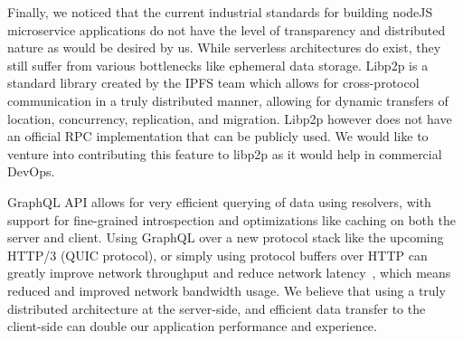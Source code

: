 Finally, we noticed that the current industrial standards for building nodeJS microservice applications do not have the level of transparency and distributed nature as would be desired by us. While serverless architectures do exist, they still suffer from various bottlenecks like ephemeral data storage. Libp2p is a standard library created by the IPFS team which allows for cross-protocol communication in a truly distributed manner, 
allowing for dynamic transfers of location, concurrency, replication, and migration. Libp2p however does not have an official RPC implementation that can be publicly used. We would like to venture into contributing this feature to libp2p as it would help in commercial DevOps.

GraphQL API allows for very efficient querying of data using resolvers, with support for fine-grained introspection and optimizations like caching on both the server and client. Using GraphQL over a new protocol stack like the upcoming HTTP/3 (QUIC protocol), or simply using protocol buffers over 
HTTP can greatly improve network throughput and reduce network latency~\cite{ModifiedQUIC}, which means reduced and improved network bandwidth usage. We believe that using a truly distributed architecture at the server-side, and efficient data transfer to the client-side can double our application performance and experience.